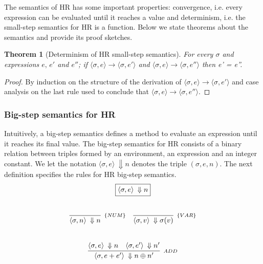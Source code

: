 \documentclass[oneside,12pt]{scrbook}
\newtheorem{Theorem}{Theorem}
\theoremstyle{definition}
\theoremstyle{plain}
\theoremstyle{definition}
\begin{document}
The semantics of HR has some important properties: convergence, i.e. every expression can be evaluated
until it reaches a value and determinism, i.e. the small-step semantics for HR is a function. Below we
state theorems about the semantics and provide its proof sketches.

\begin{Theorem}[Determinism of HR small-step semantics]
   For every $\sigma$ and expressions $e,\,e'$ and $e''$; if
   $\langle \sigma, e\rangle \to \langle \sigma, e'\rangle$ and
   $\langle \sigma, e\rangle \to \langle \sigma, e''\rangle$ then
   e' = e''.
\end{Theorem}
\begin{proof}
   By induction on the structure of the derivation of $\langle \sigma, e\rangle \to \langle \sigma, e'\rangle$ and
   case analysis on the last rule used to conclude that $\langle \sigma, e\rangle \to \langle \sigma, e''\rangle$.
\end{proof}


\subsubsection{Big-step semantics for HR}\label{subsubsection:big-step}

Intuitively, a big-step semantics defines a method to evaluate an expression until it reaches its final value.
The big-step semantics for HR consists of a binary relation between triples formed by an environment, an
expression and an integer constant. We let the notation $\langle \sigma, e \rangle\:\Downarrow n$ denotes the
triple $(\sigma, e, n)$. The next definition specifies the rules for HR big-step semantics.
\[
   \begin{array}{c}
      \fbox{$\langle \sigma, e \rangle\:\Downarrow n$} \\ \\ \\
      \begin{array}{cc}
         \infer[_{\{NUM\}}]
               {\langle \sigma, n \rangle\:\Downarrow n}{} &
         \infer[_{\{VAR\}}]
               {\langle \sigma, v \rangle\:\Downarrow \sigma(v)}{} \\ \\ \\
         \multicolumn{2}{c}{
         \infer[_{ADD}]
               {\langle \sigma, e + e' \rangle\:\Downarrow n \oplus n'}
               {\langle \sigma, e \rangle\:\Downarrow n &
                \langle \sigma, e' \rangle\:\Downarrow n'}
         }
      \end{array}
   \end{array}
\]
\end{document}
